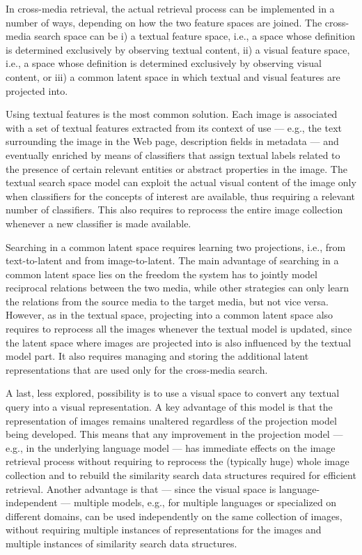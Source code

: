 In cross-media retrieval, the actual retrieval process can be implemented in a number of ways, depending on how the two feature spaces are joined.
The cross-media search space can be i) a textual feature space, i.e.,  a space whose definition is determined exclusively by observing textual content, ii)
a visual feature space, i.e.,  a space whose definition is determined exclusively by observing visual content,
or iii) a common latent space in which textual and visual features are projected into.

Using textual features is the most common solution. %
Each image is associated with a set of textual features extracted from its context of use --- e.g., the text surrounding the image in the Web page, description fields in metadata --- and eventually enriched by means of classifiers that assign textual labels related to the presence of certain relevant entities or abstract properties in the image.
The textual search space model can exploit the actual visual content of the image only when classifiers for the concepts of interest are available, thus requiring a relevant number of classifiers.
This also requires to reprocess the entire image collection whenever a new classifier is made available.

Searching in a common latent space requires learning two projections, i.e., from text-to-latent and from image-to-latent.
The main advantage of searching in a common latent space lies on the freedom the system has to jointly model reciprocal relations between the two media, while other strategies can only learn the relations from the source media to the target media, but not vice versa.
However, as in the textual space, projecting into a common latent space also requires to reprocess all the images whenever the textual model is updated, since the latent space where images are projected into is also influenced by the textual model part.
It also requires managing and storing the additional latent representations that are used only for the cross-media search.

A last, less explored, possibility is to use a visual space to convert any textual query into a visual representation.
A key advantage of this model is that the representation of images remains unaltered regardless of the projection model being developed.
This means that any improvement in the projection model --- e.g., in the underlying language model --- has immediate effects on the image retrieval process without requiring to reprocess the (typically huge) whole image collection and to rebuild the similarity search data structures required for efficient retrieval.
Another advantage is that --- since the visual space is language-independent --- multiple models, e.g., for multiple languages or specialized on different domains, can be used independently on the same collection of images, without requiring multiple instances of representations for the images and multiple instances of similarity search data structures.

